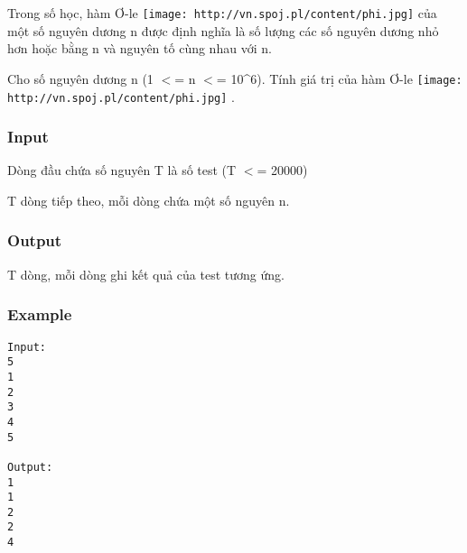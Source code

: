 



   Trong số học, hàm Ơ-le   
\texttt{[image: http://vn.spoj.pl/content/phi.jpg]}   của một số nguyên dương n được định nghĩa là số lượng các số nguyên dương nhỏ hơn hoặc bằng n và nguyên tố cùng nhau với n.  

   Cho số nguyên dương n (1 $<$= n $<$= 10\textasciicircum6). Tính giá trị của hàm Ơ-le   
\texttt{[image: http://vn.spoj.pl/content/phi.jpg]}   .  

\subsubsection{   Input  }

   Dòng đầu chứa số nguyên T là số test (T $<$= 20000)  

   T dòng tiếp theo, mỗi dòng chứa một số nguyên n.  

\subsubsection{   Output  }

   T dòng, mỗi dòng ghi kết quả của test tương ứng.  

\subsubsection{   Example  }
\begin{verbatim}
Input:
5
1
2
3
4
5

Output:
1
1
2
2
4

\end{verbatim}